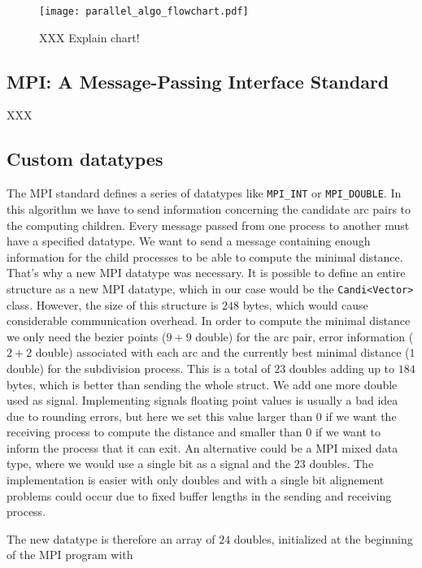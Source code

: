 \documentclass{article}
\begin{document}
\begin{figure}[p]
\texttt{[image: parallel\_algo\_flowchart.pdf]}
\caption{XXX Explain chart! \label{fig:parallel_algo_flowchart} }
\end{figure}

\subsection{MPI: A Message-Passing Interface Standard}

XXX

\subsection{Custom datatypes}

The MPI standard defines a series of datatypes like \verb+MPI_INT+ or
\verb+MPI_DOUBLE+. In this algorithm we have to send information concerning
the candidate arc pairs to the computing children. Every message passed from one
process to another must have a specified datatype. We want to send a message
containing enough information for the child processes to be able to compute the
minimal distance. That's why a new MPI datatype was necessary. It is possible
to define an entire structure as a new MPI datatype, which in our case would be
the \verb+Candi<Vector>+ class. However, the size of this structure is $248$ bytes,
which would cause considerable communication overhead. In order to compute the
minimal distance we only need the bezier points ($9+9$ double) for the arc pair,
error information ($2+2$ double) associated with each arc and the currently best
minimal distance ($1$ double) for the subdivision process. This is a total of $23$
doubles adding up to $184$ bytes, which is better than sending the whole struct.
We add one more double used as signal. Implementing signals floating point values
is usually a bad idea due to rounding errors, but here we set this value larger
than $0$ if we want the receiving process to compute the distance and smaller than
$0$ if we want to inform the process that it can exit. An alternative could be a
MPI mixed data type, where we would use a single bit as a signal and the $23$ doubles.
The implementation is easier with only doubles and with a single bit alignement
problems could occur due to fixed buffer lengths in the sending and receiving process.

The new datatype is therefore an array of $24$ doubles, initialized at the beginning
of the MPI program with
\end{document}
